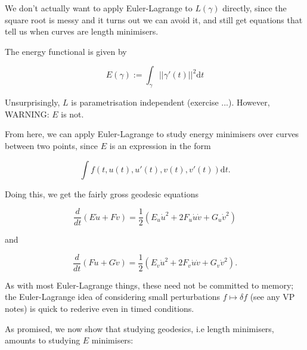 \documentclass[11pt]{scrartcl}
\begin{document}
We don't actually want to apply Euler-Lagrange to $L(\gamma)$ directly, since the square root is messy and it turns out we can avoid it, and still get equations that tell us when curves are length minimisers.

\begin{definition}
[Energy]

The energy functional is given by

\begin{equation}
    E(\gamma) := \int_\gamma ||\gamma'(t)||^2 \mathrm{d}t
\end{equation}
\end{definition}

\begin{remark}
Unsurprisingly, $L$ is parametrisation independent (exercise ...). However, WARNING: $E$ is not.
\end{remark}

From here, we can apply Euler-Lagrange to study energy minimisers over curves between two points, since $E$ is an expression in the form

\begin{equation}
    \int f(t,u(t),u'(t),v(t),v'(t)) \mathrm{d}t.
\end{equation}

\begin{proposition}
Doing this, we get the fairly gross geodesic equations

\begin{equation}
    \frac{d}{dt}\left( E\dot{u} + F\dot{v} \right) = \frac12 \left( E_u \dot{u}^2 + 2F_u \dot{u}\dot{v} + G_u \dot{v}^2 \right)
\end{equation}

and 

\begin{equation}
    \frac{d}{dt}\left( F\dot{u} + G\dot{v} \right) = \frac12 \left( E_v \dot{u}^2 + 2F_v \dot{u}\dot{v} + G_v \dot{v}^2 \right).
\label{geod 2}
\end{equation}

\end{proposition}

\begin{remark}
As with most Euler-Lagrange things, these need not be committed to memory; the Euler-Lagrange idea of considering small perturbations $f \mapsto \delta f$ (see any VP notes) is quick to rederive even in timed conditions.
\end{remark}

As promised, we now show that studying geodesics, i.e length minimisers, amounts to studying $E$ minimisers:
\end{document}
